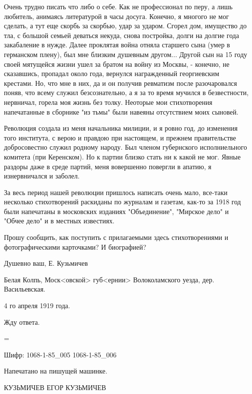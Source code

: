 Очень трудно писать что либо о себе. Как не профессионал по перу, а лишь любитель, анимаясь литературой в часы досуга. Конечно, я многого не мог сделать, а тут еще скорбь за скорбью, удар за ударом. Сгорел дом, имущество до тла, с большой семьей деваться некуда, снова постройка, долги на долгие года закабаление в нужде. Далее проклятая война отняла старшего сына (умер в германском плену), был мне близким душевным другом... Другой сын на 15 году своей мятущейся жизни ушел за братом на войну из Москвы, - конечно, не сказавшись, пропадал около года, вернулся награжденный георгиевским крестами. Но, что мне в них, да и он получив ревматизм после разочаровался поняв, что всему служил безсознательно, а я за то время мучился в безвестности, нервничал, горела моя жизнь без толку. Неоторые мои стихотворения напечатанные в сборнике "из тьмы" были навеяны отсутствием моих сыновей.

Революция создала из меня начальника милиции, и я ровно год, до изменения того института, с верою и правдою при настоящем, и прежнем правительстве добросовестно служил родному народу. Был членом губернского исполниельного комитета (при Керенском). Но к партии близко стать ни к какой не мог. Явные раздоры даже в среде партий, меня вовершенно повергли в апатию, я изнервничался и заболел.

За весь период нашей революции пришлось написать очень мало, все-таки несколько стихотворений раскиданы по журналам и газетам, как-то за 1918 год были напечатаны в московских изданиях "Объединение", "Мирское дело" и "Обчее дело" и в местных известиях.

Прошу сообщить, как поступить с прилагаемыми здесь стихотворениями и фотографическими карточками? И биографией?

Душевно ваш, Е. Кузьмичев

Белая Колпь, Моск<овской> губ<ернии> Волоколамского уезда, дер. Васильевская.

4 го апреля 1919 года.

Жду ответа.


=

Шифр:   1068-1-85_005
        1068-1-85_006

Напечатано на пишущей машинке.

КУЗЬМИЧЕВ ЕГОР КУЗЬМИЧЕВ


